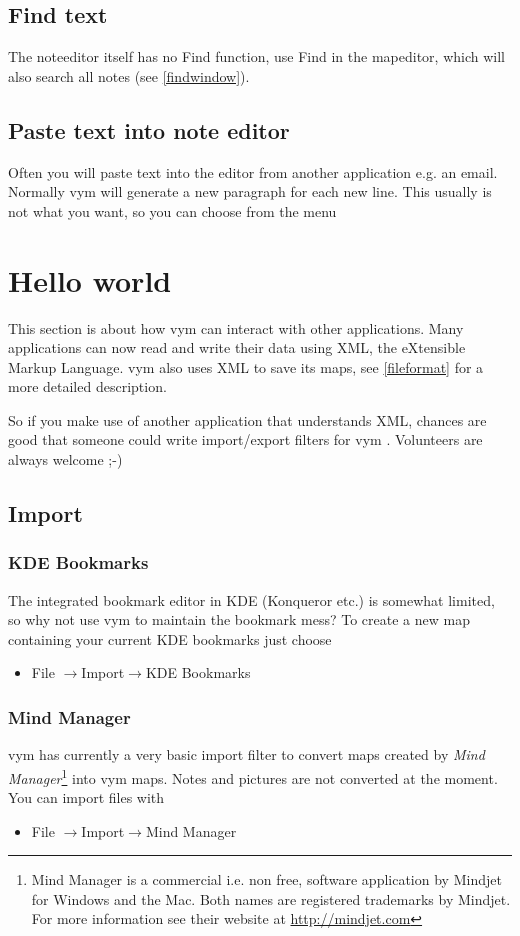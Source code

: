 \documentclass[12pt,a4paper]{article}
\newcommand{\vym}{{\sc vym }}
\newcommand{\ra}{$\longrightarrow$}
\begin{document}
\subsection{Find text}
The noteeditor itself has no Find function, use Find in the mapeditor,
which will also search all notes (see \ref{findwindow}).

\subsection{Paste text into note editor}
Often you will paste text into the editor from another application e.g.
an email. Normally \vym will generate a new paragraph for each new line.
This usually is not what you want, so you can choose from the menu


\section{Hello world}
This section is about how \vym can interact with other applications.
Many applications can now read and write their data using XML, the
eXtensible Markup Language. \vym also uses XML to save its maps, see
\ref{fileformat} for a more detailed description. 

So if you make use of another application that understands XML, chances are good that someone
could write import/export filters for \vym. Volunteers are always
welcome ;-)

\subsection{Import} \label{import}

\subsubsection*{KDE Bookmarks}
The integrated bookmark editor in KDE (Konqueror etc.) is somewhat limited, so why not
use \vym to maintain the bookmark mess? To create a new map containing
your current KDE bookmarks just choose
\begin{itemize}
	\item File \ra Import\ra KDE Bookmarks
\end{itemize}

\subsubsection*{Mind Manager}
\vym has currently a very basic import filter to convert maps created by
{\em Mind Manager}\footnote{Mind Manager is a commercial i.e. non free, software application by Mindjet for Windows and the Mac. Both names are registered trademarks by Mindjet. For more information see their website at
\href{http://mindjet.com}{http://mindjet.com}} into \vym maps. Notes and
pictures are not converted at the moment. You can import files with
\begin{itemize}
	\item File \ra Import\ra Mind Manager
\end{itemize}
\end{document}

